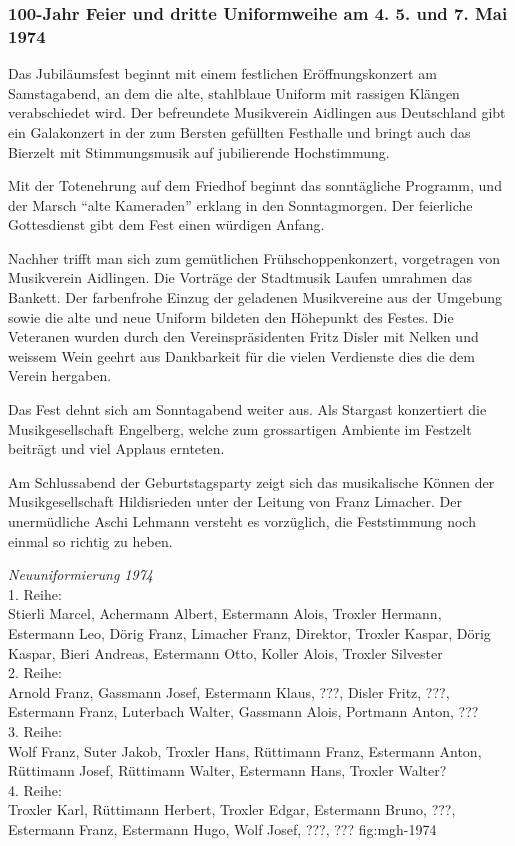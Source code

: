 \begin{history}
    \subsubsection*{100-Jahr Feier und dritte Uniformweihe am 4. 5. und 7. Mai 1974}

    Das Jubiläumsfest beginnt mit einem festlichen Eröffnungskonzert am
    Samstagabend, an dem die alte, stahlblaue Uniform mit rassigen Klängen
    verabschiedet wird. Der befreundete Musikverein Aidlingen aus Deutschland
    gibt ein Galakonzert in der zum Bersten gefüllten Festhalle und bringt auch
    das Bierzelt mit Stimmungsmusik auf jubilierende Hochstimmung.

    Mit der Totenehrung auf dem Friedhof beginnt das sonntägliche Programm, und
    der Marsch \enquote{alte Kameraden} erklang in den Sonntagmorgen. Der
    feierliche Gottesdienst gibt dem Fest einen würdigen Anfang.

    Nachher trifft man sich zum gemütlichen Frühschoppenkonzert, vorgetragen von
    Musikverein Aidlingen. Die Vorträge der Stadtmusik Laufen umrahmen das
    Bankett. Der farbenfrohe Einzug der geladenen Musikvereine aus der Umgebung
    sowie die alte und neue Uniform bildeten den Höhepunkt des Festes. Die
    Veteranen wurden durch den Vereinspräsidenten Fritz Disler mit Nelken und
    weissem Wein geehrt aus Dankbarkeit für die vielen Verdienste dies die dem
    Verein hergaben.

    Das Fest dehnt sich am Sonntagabend weiter aus. Als Stargast konzertiert die
    Musikgesellschaft Engelberg, welche zum grossartigen Ambiente im Festzelt
    beiträgt und viel Applaus ernteten.

    Am Schlussabend der Geburtstagsparty zeigt sich das musikalische Können der
    Musikgesellschaft Hildisrieden unter der Leitung von Franz Limacher. Der
    unermüdliche Aschi Lehmann versteht es vorzüglich, die Feststimmung noch
    einmal so richtig zu heben.

\end{history}

{\emph{Neuuniformierung 1974}\\
    1. Reihe:\\
    Stierli Marcel, Achermann Albert, Estermann Alois, Troxler Hermann,
    Estermann Leo, Dörig Franz, Limacher Franz, Direktor, Troxler Kaspar, Dörig
    Kaspar, Bieri Andreas, Estermann Otto, Koller Alois, Troxler Silvester\\
    2. Reihe:\\
    Arnold Franz, Gassmann Josef, Estermann Klaus, ???, Disler Fritz, ???,
    Estermann Franz, Luterbach Walter, Gassmann Alois, Portmann Anton, ???\\
    3. Reihe:\\
    Wolf Franz, Suter Jakob, Troxler Hans, Rüttimann Franz, Estermann Anton,
    Rüttimann Josef, Rüttimann Walter, Estermann Hans, Troxler Walter?\\
    4. Reihe:\\
    Troxler Karl, Rüttimann Herbert, Troxler Edgar, Estermann Bruno, ???,
    Estermann Franz, Estermann Hugo, Wolf Josef, ???, ??? } {fig:mgh-1974}